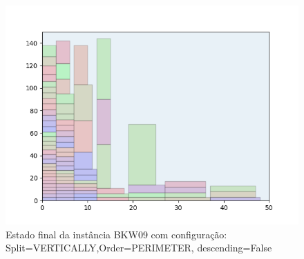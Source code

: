 \begin{figure}[H]
    \centering
    \caption[]{Estado final da instância BKW09 com configuração: Split=VERTICALLY,Order=PERIMETER, descending=False}
    \label{fig:bkw09-vertically-perimeter-false}
    \includegraphics[scale=0.5]{output/figures/bkw/bkw09/vertically/perimeter/false/000}
\end{figure}